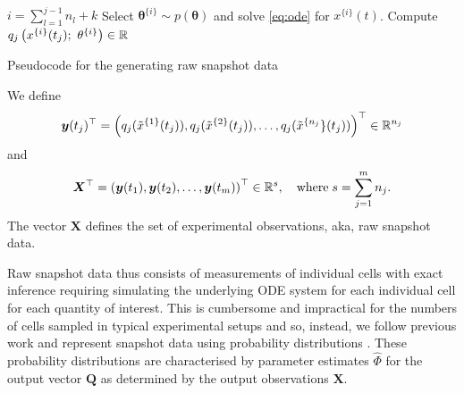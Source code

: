 \begin{algorithm}[H]
	\footnotesize
	\texttt{\\}
	\begin{algorithmic}
               \State $i=\sum_{l=1}^{j-1} n_l + k$
               \State Select $\boldsymbol{\theta}^{\{i\}} \sim p(\boldsymbol{\theta})$ and solve \eqref{eq:ode} for $x^{\{i\}}(t)$.
               \State Compute $q_j\left( x^{\{i\}}(t_j); \ \theta^{\{i\}} \right) \in \R$
            \EndFor
        \EndFor
	\end{algorithmic}
	\caption{Pseudocode for the generating raw snapshot data}\label{alg:raw}
\end{algorithm}
We define
\begin{equation}
\boldsymbol{y}(t_j)^\top = \left( q_j(\tilde x^{\{1\}}(t_j)), q_j(\tilde x^{\{2\}}(t_j)), \dots, q_j(\tilde x^{\{n_j}\}(t_j))  \right)^\top  \in \mathbb{R}^{n_j}
\end{equation}
and
\begin{equation}
  \boldsymbol{X}^\top = \left( \boldsymbol{y}(t_1), \boldsymbol{y}(t_2), \dots, \boldsymbol{y}(t_m) \right)^\top \in \mathbb{R}^s,
                        \quad \hbox{where} \; s = \sum_{j=1}^m n_j.
\end{equation}
The vector $\boldsymbol{X}$ defines the set of experimental observations, aka, raw snapshot data.

Raw snapshot data thus consists of measurements of individual cells with exact inference requiring simulating the underlying ODE system for each individual cell for each quantity of interest. This is cumbersome and impractical for the numbers of cells sampled in typical experimental setups and so, instead, we follow previous work and represent snapshot data using probability distributions \cite{hasenauer2011identification,hasenauer2014ode,loos2018hierarchical,dixit2018maximum}.
These probability distributions are characterised by parameter estimates $\hat{\Phi}$ for the output vector $\boldsymbol{Q}$ as determined by the output observations $\boldsymbol{X}$.

